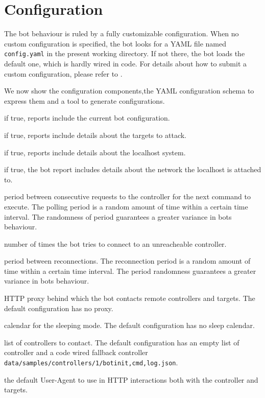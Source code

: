 \section{Configuration}
\label{sec:configuration}

The bot behaviour is ruled by a fully customizable configuration. When no custom configuration is specified, the bot looks for a YAML file named \texttt{config.yaml} in the present working directory. If not there, the bot loads the default one, which is hardly wired in code. For details about how to submit a custom configuration, please refer to .

We now show the configuration components,the YAML configuration schema to express them and a tool to generate configurations.

\begin{description}
  \setlength\itemsep{1em}

  \item[cnfInfo] if true, reports include the current bot configuration.

  \item[tgtInfo] if true, reports include details about the targets to attack.

  \item[sysInfo] if true, reports include details about the localhost system.

  \item[netInfo] if true, the bot report includes details about the network the localhost is attached to.

  \item[polling] period between consecutive requests to the controller for the next command to execute. The polling period is a random amount of time within a certain time interval. The randomness of period guarantees a greater variance in bots behaviour.

  \item[reconnections] number of times the bot tries to connect to an unreacheable controller.

  \item[reconnectionWait] period between reconnections. The reconnection period is a random amount of time within a certain time interval. The period randomness guarantees a greater variance in bots behaviour.

  \item[proxy] HTTP proxy behind which the bot contacts remote controllers and targets. The default configuration has no proxy.

  \item[sleep] calendar for the sleeping mode. The default configuration has no sleep calendar.

  \item[controllers] list of controllers to contact. The default configuration has an empty list of controller and a code wired fallback controller \texttt{data/samples/controllers/1/bot{init,cmd,log}.json}.

  \item[userAgent] the default User-Agent to use in HTTP interactions both with the controller and targets.
\end{description}

